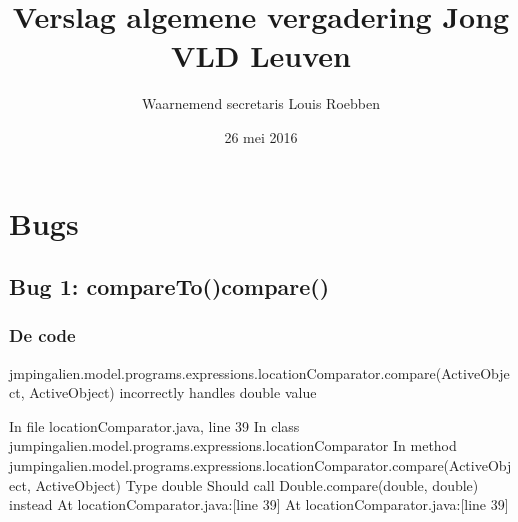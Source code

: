 \documentclass[a4paper]{article}
\begin{document}
	\title{Verslag algemene vergadering Jong VLD Leuven}
	\author{Waarnemend secretaris Louis Roebben}
	\date{26 mei 2016}
\maketitle
\section{Bugs}
\subsection{Bug 1: compareTo()compare()}
\subsubsection{De code}
 jmpingalien.model.programs.expressions.locationComparator.compare(ActiveObject, ActiveObject) incorrectly handles double value


In file locationComparator.java, line 39
In class jumpingalien.model.programs.expressions.locationComparator
In method jumpingalien.model.programs.expressions.locationComparator.compare(ActiveObject, ActiveObject)
Type double
Should call Double.compare(double, double) instead
At locationComparator.java:[line 39]
At locationComparator.java:[line 39]
\end{document}
